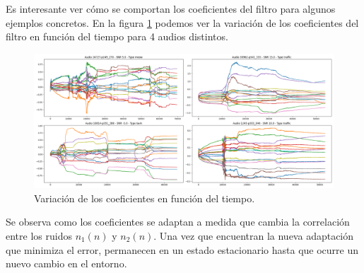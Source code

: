 Es interesante ver cómo se comportan los coeficientes del filtro para algunos ejemplos concretos. En la figura \ref{fig:ch6_variacion_temporal_de_coeficientes}  podemos ver la variación de los coeficientes del filtro en función del tiempo para 4 audios distintos. 

\begin{figure}
	\centering
	\centerline{\includegraphics[scale=0.35]{images/ch6/weights.png}}
	\caption{Variación de los coeficientes en función del tiempo.}
	\label{fig:ch6_variacion_temporal_de_coeficientes}
\end{figure}

Se observa como los coeficientes se adaptan a medida que cambia la correlación entre los ruidos $n_1(n)$ y $n_2(n)$. Una vez que encuentran la nueva adaptación que minimiza el error, permanecen en un estado estacionario hasta que ocurre un nuevo cambio en el entorno.